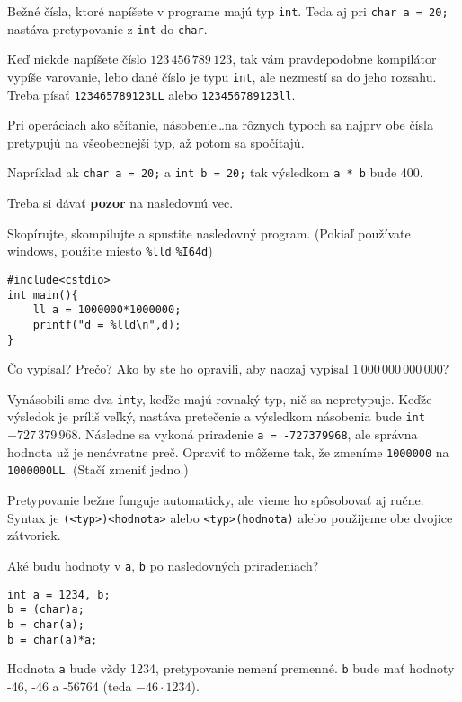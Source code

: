 \medskip

Bežné čísla, ktoré napíšete v programe majú typ \verb!int!.  Teda aj pri
\verb!char a = 20;! nastáva pretypovanie z \verb!int! do \verb!char!.

Keď niekde napíšete číslo $123\,456\,789\,123$, tak vám pravdepodobne kompilátor
vypíše varovanie, lebo dané číslo je typu \verb!int!, ale nezmestí sa do jeho
rozsahu. Treba písať \verb!123465789123LL! alebo \verb!123456789123ll!.

\medskip

Pri operáciach ako sčítanie, násobenie\dots na rôznych typoch sa najprv obe
čísla pretypujú na všeobecnejší typ, až potom sa spočítajú.

Napríklad ak \verb!char a = 20;! a \verb!int b = 20;! tak výsledkom \verb!a * b!
bude 400.

Treba si dávať \textbf{pozor} na nasledovnú vec.

\cvicenie Skopírujte, skompilujte a spustite nasledovný program.  (Pokiaľ
používate windows, použite miesto \verb!%lld! \verb!%I64d!)
\begin{lstlisting}
#include<cstdio>
int main(){
    ll a = 1000000*1000000;    
    printf("d = %lld\n",d);
}
\end{lstlisting}
Čo vypísal? Prečo? Ako by ste ho opravili, aby naozaj vypísal
$1\,000\,000\,000\,000$?

\riesenie Vynásobili sme dva \verb!int!y, keďže majú rovnaký typ, nič sa
nepretypuje.  Keďže výsledok je príliš veľký, nastáva pretečenie a výsledkom
násobenia bude \verb!int!  $-727\,379\,968$. Následne sa vykoná priradenie
\verb!a = -727379968!, ale správna hodnota už je nenávratne preč. Opraviť to
môžeme tak, že zmeníme \verb!1000000! na \verb!1000000LL!. (Stačí zmeniť
jedno.)

\medskip

Pretypovanie bežne funguje automaticky, ale vieme ho spôsobovať aj ručne.
Syntax je \verb!(<typ>)<hodnota>! alebo \verb!<typ>(hodnota)! alebo použijeme
obe dvojice zátvoriek.

\cvicenie Aké budu hodnoty v \verb!a!, \verb!b! po nasledovných priradeniach? 
\begin{lstlisting}
int a = 1234, b;
b = (char)a;
b = char(a);
b = char(a)*a;
\end{lstlisting}

\riesenie Hodnota \verb!a! bude vždy 1234, pretypovanie nemení premenné. 
\verb!b! bude mať hodnoty -46, -46 a -56764 (teda $-46\cdot 1234$).

